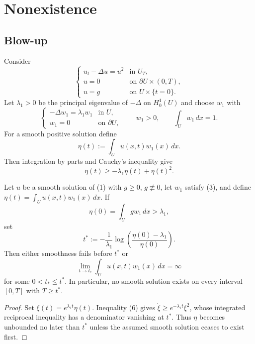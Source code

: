 \section{Nonexistence}
\label{sec:nonexistence}

\subsection{Blow-up}
\label{sec:blow-up}

Consider
\[
\begin{cases}
u_t-\Delta u=u^2 & \text{in }U_T,\\
u=0 & \text{on }\partial U\times(0,T),\\
u=g & \text{on }U\times\{t=0\}.
\end{cases}
\tag{1}
\]
Let $\lambda_1>0$ be the principal eigenvalue of $-\Delta$ on $H_0^1(U)$ and choose $w_1$ with
\[
\begin{cases}
-\Delta w_1=\lambda_1w_1 & \text{in }U,\\
w_1=0 & \text{on }\partial U,
\end{cases}
\qquad
w_1>0,
\qquad
\int_Uw_1\,dx=1.
\tag{3}
\]
For a smooth positive solution define
\[
\eta(t):=\int_Uu(x,t)w_1(x)\,dx.
\]
Then integration by parts and Cauchy's inequality give
\[
\dot\eta(t)\geq-\lambda_1\eta(t)+\eta(t)^2.
\tag{6}
\]

\begin{theorem}
\label{thm:blowup-large-data}
Let $u$ be a smooth solution of (1) with $g\geq0$, $g\not\equiv0$, let $w_1$ satisfy (3), and define $\eta(t)=\int_Uu(x,t)w_1(x)\,dx$. If
\[
\eta(0) = \int_U gw_1 \, dx > \lambda_1,
\]
set
\[
t^*:=-\frac1{\lambda_1}\log\left(\frac{\eta(0)-\lambda_1}{\eta(0)}\right).
\tag{10}
\]
Then either smoothness fails before $t^*$ or
\[
\lim_{t \to t_*} \int_U u(x,t)w_1(x) \, dx = \infty
\]
for some $0<t_*\leq t^*$. In particular, no smooth solution exists on every interval $[0,T]$ with $T\geq t^*$.
\end{theorem}

\begin{proof}
\sketch Set $\xi(t)=e^{\lambda_1t}\eta(t)$. Inequality (6) gives $\dot\xi\geq e^{-\lambda_1t}\xi^2$, whose integrated reciprocal inequality has a denominator vanishing at $t^*$. Thus $\eta$ becomes unbounded no later than $t^*$ unless the assumed smooth solution ceases to exist first.
\end{proof}

